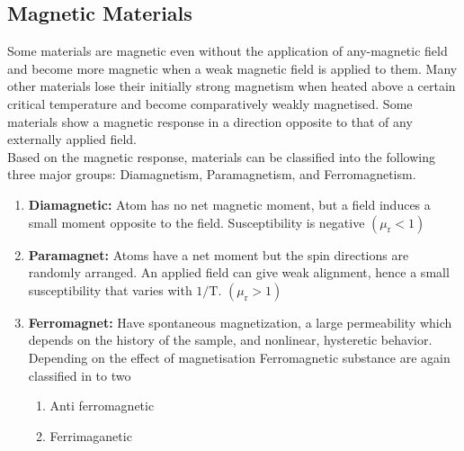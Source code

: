 \subsection{Magnetic Materials}
Some materials are magnetic even without the application of any-magnetic field and become more magnetic when a weak magnetic field is applied to them. Many other materials lose their initially strong magnetism when heated above a certain critical temperature and become comparatively weakly magnetised.
Some materials show a magnetic response in a direction opposite to that of any externally applied field.\\ Based on the magnetic response, materials can be classified into the following three major groups:  Diamagnetism,  Paramagnetism,  and Ferromagnetism.
\begin{enumerate}
	\item \textbf{Diamagnetic:}
	Atom has no net magnetic moment, but a field induces a small moment opposite to the field. Susceptibility is negative $\left(\mu_{\mathrm{r}}<1\right)$
    \item \textbf{Paramagnet:} Atoms have a net moment but the spin directions are randomly arranged. An applied field can give weak alignment, hence a small susceptibility that varies with $1 / \mathrm{T}$. $\left(\mu_{\mathrm{r}}>1\right)$
	\item \textbf{Ferromagnet:} Have spontaneous magnetization, a large permeability which depends on the history of the sample, and nonlinear, hysteretic behavior. Depending on the effect of magnetisation Ferromagnetic substance are again classified in to two
	\begin{enumerate}
		\item Anti ferromagnetic
		\item Ferrimaganetic
	\end{enumerate}
\end{enumerate}

